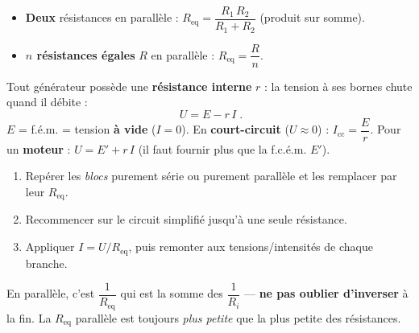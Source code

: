 \documentclass[11pt,a4paper]{article}
\begin{document}
\begin{cle}
\begin{itemize}[leftmargin=1.5em,topsep=1pt,itemsep=0pt]
  \item \textbf{Deux} résistances en parallèle : $R_{\text{eq}}=\dfrac{R_1\,R_2}{R_1+R_2}$ (produit sur somme).
  \item \textbf{$n$ résistances égales} $R$ en parallèle : $R_{\text{eq}}=\dfrac{R}{n}$.
\end{itemize}
\end{cle}

\begin{cle}
Tout générateur possède une \textbf{résistance interne} $r$ : la tension à ses bornes chute quand il
débite : \[ \boxed{\;U=E-r\,I\;}. \]
$E$ = f.é.m. = tension \textbf{à vide} ($I=0$). En \textbf{court-circuit} ($U\approx0$) :
$I_{\text{cc}}=\dfrac{E}{r}$. Pour un \textbf{moteur} : $U=E'+r\,I$ (il faut fournir plus que la f.c.é.m. $E'$).
\end{cle}

\begin{center}
\end{center}

\begin{methode}
\begin{enumerate}[leftmargin=1.7em,topsep=1pt,itemsep=0pt]
  \item Repérer les \emph{blocs} purement série ou purement parallèle et les remplacer par leur $R_{\text{eq}}$.
  \item Recommencer sur le circuit simplifié jusqu'à une seule résistance.
  \item Appliquer $I=U/R_{\text{eq}}$, puis remonter aux tensions/intensités de chaque branche.
\end{enumerate}
\end{methode}

\begin{piege}
En parallèle, c'est $\dfrac{1}{R_{\text{eq}}}$ qui est la somme des $\dfrac{1}{R_i}$ — \textbf{ne pas
oublier d'inverser} à la fin. La $R_{\text{eq}}$ parallèle est toujours \emph{plus petite} que la plus
petite des résistances.
\end{piege}
\end{document}

